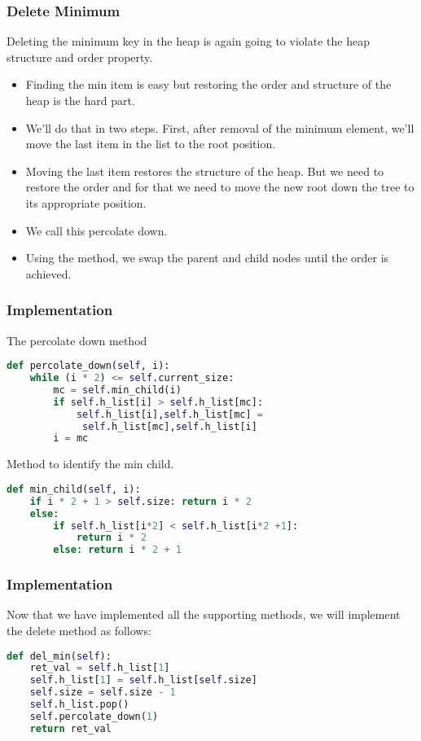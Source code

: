 \documentclass{beamer}
\begin{document}
\begin{frame}[fragile]
\frametitle{Delete Minimum}
Deleting the minimum key in the heap is again going to violate the heap structure and order property.
\begin{itemize}
\item Finding the min item is easy but restoring the order and structure of the heap is the hard part.
\item We'll do that in two steps. First, after removal of the minimum element, we'll move the last item in the list to the root position.
\item Moving the last item restores the structure of the heap. But we need to restore the order and for that we need to move the new root down the tree  to its appropriate position.
\item We  call this percolate down.
\item Using the method, we swap the parent and child nodes until the order is achieved.
\end{itemize}
\end{frame}

\begin{frame}[fragile]
\frametitle{Implementation}
The percolate down method
\begin{lstlisting}[language=Python]
def percolate_down(self, i):
    while (i * 2) <= self.current_size:
        mc = self.min_child(i)
        if self.h_list[i] > self.h_list[mc]:
            self.h_list[i],self.h_list[mc] =
             self.h_list[mc],self.h_list[i]
        i = mc
\end{lstlisting}

Method to identify the min child.
\begin{lstlisting}[language=Python]
def min_child(self, i):
    if i * 2 + 1 > self.size: return i * 2
    else:
        if self.h_list[i*2] < self.h_list[i*2 +1]:
            return i * 2
        else: return i * 2 + 1
\end{lstlisting}
\end{frame}

\begin{frame}[fragile]
\frametitle{Implementation}
Now that we have implemented all the supporting methods, we will implement the delete method as follows:
\begin{lstlisting}[language=Python]
def del_min(self):
    ret_val = self.h_list[1]
    self.h_list[1] = self.h_list[self.size]
    self.size = self.size - 1
    self.h_list.pop()
    self.percolate_down(1)
    return ret_val
\end{lstlisting}
\end{frame}
\end{document}
